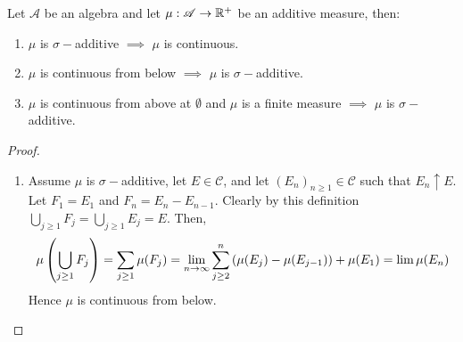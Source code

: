 \begin{lemma}\label{lem:continuity}
  Let $ \mathscr{A}$ be an algebra and let $\mu: \mathscr{A}\to \mathbb{R}^+$ be an additive measure, then:
  \begin{enumerate}
    \item $\mu$ is $\sigma-$additive $\implies$ $\mu$ is continuous.
    \item $\mu$ is continuous from below $\implies$ $\mu$ is $\sigma-$additive.
    \item $\mu$ is continuous from above at $\emptyset$ and $\mu$ is a finite measure $\implies$ $\mu$ is $\sigma-$additive.
  \end{enumerate}
\end{lemma}
\begin{proof}
  \begin{enumerate}
    \item Assume $\mu$ is $\sigma-$additive, let $E\in \mathscr{C}$, and let $(E_n)_{n\geq 1}\in \mathscr{C}$ such that $E_n \uparrow E$. Let $F_1 = E_1$ and $F_n = E_n-E_{n-1}$. Clearly by this definition $\bigcup_{j\geq 1} F_j = \bigcup_{j\geq 1} E_j = E$. Then,
      \[\mu\left(\bigcup_{j\geq 1} F_j\right) = \sum_{j\geq 1}\mu(F_j) = \lim_{n\to\infty}\sum_{j\geq 2}^n\left(\mu(E_j)- \mu(E_{j-1})\right) + \mu(E_1) = \lim\mu(E_n)\]
      Hence $\mu$ is continuous from below. 

\end{enumerate}
\end{proof}

